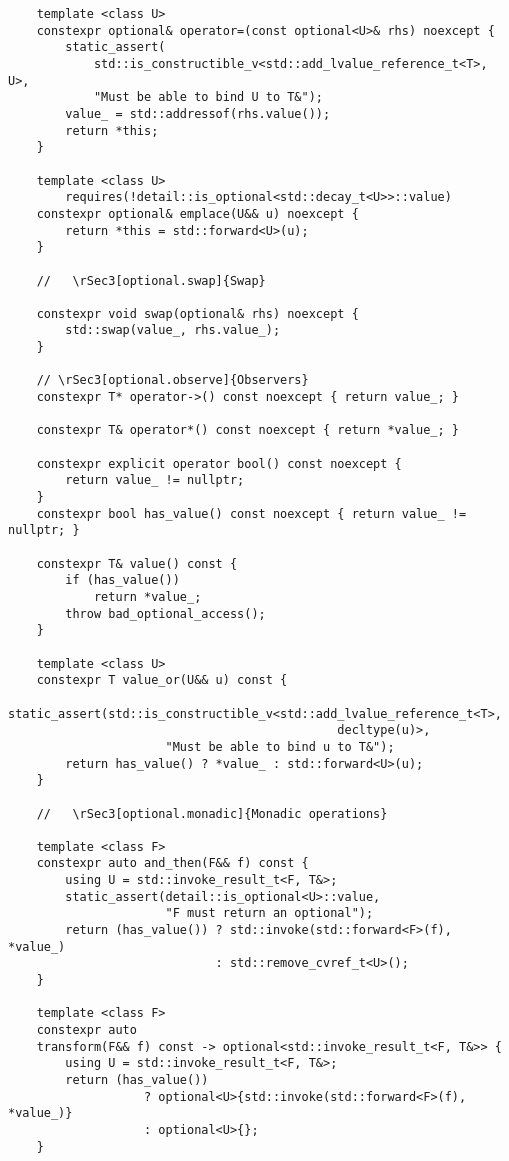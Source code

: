 \documentclass[a4paper,10pt,oneside,openany,final,article]{memoir}
\begin{document}
\begin{verbatim}
    template <class U>
    constexpr optional& operator=(const optional<U>& rhs) noexcept {
        static_assert(
            std::is_constructible_v<std::add_lvalue_reference_t<T>, U>,
            "Must be able to bind U to T&");
        value_ = std::addressof(rhs.value());
        return *this;
    }

    template <class U>
        requires(!detail::is_optional<std::decay_t<U>>::value)
    constexpr optional& emplace(U&& u) noexcept {
        return *this = std::forward<U>(u);
    }

    //   \rSec3[optional.swap]{Swap}

    constexpr void swap(optional& rhs) noexcept {
        std::swap(value_, rhs.value_);
    }

    // \rSec3[optional.observe]{Observers}
    constexpr T* operator->() const noexcept { return value_; }

    constexpr T& operator*() const noexcept { return *value_; }

    constexpr explicit operator bool() const noexcept {
        return value_ != nullptr;
    }
    constexpr bool has_value() const noexcept { return value_ != nullptr; }

    constexpr T& value() const {
        if (has_value())
            return *value_;
        throw bad_optional_access();
    }

    template <class U>
    constexpr T value_or(U&& u) const {
        static_assert(std::is_constructible_v<std::add_lvalue_reference_t<T>,
                                              decltype(u)>,
                      "Must be able to bind u to T&");
        return has_value() ? *value_ : std::forward<U>(u);
    }

    //   \rSec3[optional.monadic]{Monadic operations}

    template <class F>
    constexpr auto and_then(F&& f) const {
        using U = std::invoke_result_t<F, T&>;
        static_assert(detail::is_optional<U>::value,
                      "F must return an optional");
        return (has_value()) ? std::invoke(std::forward<F>(f), *value_)
                             : std::remove_cvref_t<U>();
    }

    template <class F>
    constexpr auto
    transform(F&& f) const -> optional<std::invoke_result_t<F, T&>> {
        using U = std::invoke_result_t<F, T&>;
        return (has_value())
                   ? optional<U>{std::invoke(std::forward<F>(f), *value_)}
                   : optional<U>{};
    }


\end{verbatim}
\end{document}
